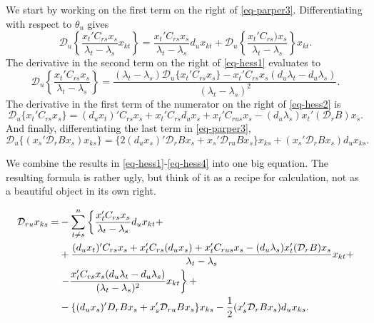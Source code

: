 \documentclass[
  12pt,
  letterpaper,
  DIV=11,
  numbers=noendperiod]{scrartcl}
\begin{document}
We start by working on the first term on the right of
\eqref{eq-parper3}. Differentiating with respect to \(\theta_u\) gives
\begin{equation}
\mathcal{D}_{u}\left\{\frac{x_t'C_{rs}x_s}{\lambda_t-\lambda_s}x_{kt}\right\}=\frac{x_t'C_{rs}x_s}{\lambda_t-\lambda_s}d_ux_{kt}+
\mathcal{D}_{u}\left\{\frac{x_t'C_{rs})x_s}{\lambda_t-\lambda_s}\right\}x_{kt}.\label{eq-hess1}
\end{equation} The derivative in the second term on the right of
\eqref{eq-hess1} evaluates to \begin{equation}
\mathcal{D}_{u}\left\{\frac{x_t'C_{rs}x_s}{\lambda_t-\lambda_s}\right\}=
\frac{(\lambda_t-\lambda_s)\mathcal{D}_u\{x_t'C_{rs}x_s\}-x_t'C_{rs}x_s(d_u\lambda_t-d_u\lambda_s)}{(\lambda_t-\lambda_s)^2}.\label{eq-hess2}
\end{equation} The derivative in the first term of the numerator on the
right of \eqref{eq-hess2} is \begin{equation}
\mathcal{D}_u\{x_t'C_{rs}x_s\}=
(d_ux_t)'C_{rs}x_s+
x_t'C_{rs}d_ux_s+
x_t'C_{rus}x_s-(d_u\lambda_s)x_t'(\mathcal{D}_rB)x_s.
\label{eq-hess3}\end{equation} And finally, differentiating the last
term in \eqref{eq-parper3}, \begin{equation}
\mathcal{D}_u\{(x_s'\mathcal{D}_rBx_s)x_{ks}\}=\{2(d_ux_s)'\mathcal{D}_rBx_s+x_s'\mathcal{D}_{ru}Bx_s\}x_{ks}+(x_s'\mathcal{D}_rBx_s)d_ux_{ks}.
\label{eq-hess4}
\end{equation}

We combine the results in \eqref{eq-hess1}-\eqref{eq-hess4} into one big
equation. The resulting formula is rather ugly, but think of it as a
recipe for calculation, not as a beautiful object in its own right.

\begin{align}
\mathcal{D}_{ru}x_{ks}=&-\sum_{t\not= s}^n\left\{
\frac{x_t'C_{rs}x_s}{\lambda_t-\lambda_s}d_ux_{kt}+\right.\notag\\
&+\frac{(d_ux_t)'C_{rs}x_s+x_t'C_{rs}(d_ux_s)+
x_t'C_{rus}x_s-(d_u\lambda_s)x_t'(\mathcal{D}_rB)x_s}{\lambda_t-\lambda_s}x_{kt}+\notag\\
&\left.-\frac{x_t'C_{rs}x_s(d_u\lambda_t-d_u\lambda_s)}{(\lambda_t-\lambda_s)^2}x_{kt}\right\}+\notag\\
&-\{(d_ux_s)'D_rBx_s+x_s'\mathcal{D}_{ru}Bx_s\}x_{ks}-\frac12(x_s'\mathcal{D}_rBx_s)d_ux_{ks}.
\label{eq-horrible}
\end{align}
\end{document}
